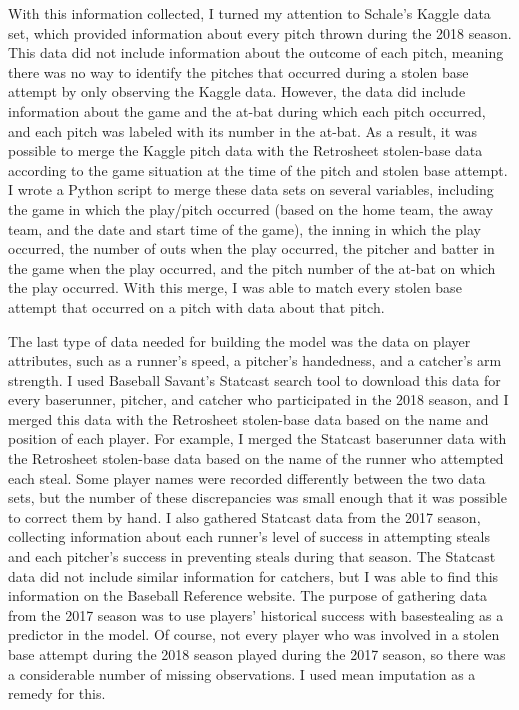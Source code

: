\documentclass{article}
\begin{document}
With this information collected, I turned my attention to Schale’s Kaggle data set, which provided information about every pitch thrown during the 2018 season. This data did not include information about the outcome of each pitch, meaning there was no way to identify the pitches that occurred during a stolen base attempt by only observing the Kaggle data. However, the data did include information about the game and the at-bat during which each pitch occurred, and each pitch was labeled with its number in the at-bat. As a result, it was possible to merge the Kaggle pitch data with the Retrosheet stolen-base data according to the game situation at the time of the pitch and stolen base attempt. I wrote a Python script to merge these data sets on several variables, including the game in which the play/pitch occurred (based on the home team, the away team, and the date and start time of the game), the inning in which the play occurred, the number of outs when the play occurred, the pitcher and batter in the game when the play occurred, and the pitch number of the at-bat on which the play occurred. With this merge, I was able to match every stolen base attempt that occurred on a pitch with data about that pitch.  

The last type of data needed for building the model was the data on player attributes, such as a runner’s speed, a pitcher’s handedness, and a catcher’s arm strength. I used Baseball Savant’s Statcast search tool to download this data for every baserunner, pitcher, and catcher who participated in the 2018 season, and I merged this data with the Retrosheet stolen-base data based on the name and position of each player. For example, I merged the Statcast baserunner data with the Retrosheet stolen-base data based on the name of the runner who attempted each steal. Some player names were recorded differently between the two data sets, but the number of these discrepancies was small enough that it was possible to correct them by hand.  I also gathered Statcast data from the 2017 season, collecting information about each runner’s level of success in attempting steals and each pitcher’s success in preventing steals during that season. The Statcast data did not include similar information for catchers, but I was able to find this information on the Baseball Reference website. The purpose of gathering data from the 2017 season was to use players’ historical success with basestealing as a predictor in the model. Of course, not every player who was involved in a stolen base attempt during the 2018 season played during the 2017 season, so there was a considerable number of missing observations. I used mean imputation as a remedy for this.
\end{document}
